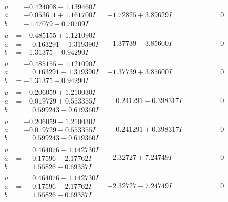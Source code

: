 \documentclass[1p]{elsarticle_modified}
\theoremstyle{definition}
\begin{document}
$$\begin{array}{c|c|c}
\begin{aligned}
u &= -0.424008 - 1.139460 I \\
a &= -0.053611 + 1.161700 I \\
b &= -1.47079 + 0.70709 I\end{aligned}
 & -1.72825 + 3.89629 I & \phantom{-0.000000 } 0 \\ \hline\begin{aligned}
u &= -0.485155 + 1.121090 I \\
a &= \phantom{-}0.163291 - 1.319390 I \\
b &= -1.31375 - 0.94290 I\end{aligned}
 & -1.37739 - 3.85600 I & \phantom{-0.000000 } 0 \\ \hline\begin{aligned}
u &= -0.485155 - 1.121090 I \\
a &= \phantom{-}0.163291 + 1.319390 I \\
b &= -1.31375 + 0.94290 I\end{aligned}
 & -1.37739 + 3.85600 I & \phantom{-0.000000 } 0 \\ \hline\begin{aligned}
u &= -0.206059 + 1.210030 I \\
a &= -0.019729 + 0.553355 I \\
b &= \phantom{-}0.599243 - 0.619360 I\end{aligned}
 & \phantom{-}0.241291 - 0.398317 I & \phantom{-0.000000 } 0 \\ \hline\begin{aligned}
u &= -0.206059 - 1.210030 I \\
a &= -0.019729 - 0.553355 I \\
b &= \phantom{-}0.599243 + 0.619360 I\end{aligned}
 & \phantom{-}0.241291 + 0.398317 I & \phantom{-0.000000 } 0 \\ \hline\begin{aligned}
u &= \phantom{-}0.464076 + 1.142730 I \\
a &= \phantom{-}0.17596 - 2.17762 I \\
b &= \phantom{-}1.55826 - 0.69337 I\end{aligned}
 & -2.32727 + 7.24749 I & \phantom{-0.000000 } 0 \\ \hline\begin{aligned}
u &= \phantom{-}0.464076 - 1.142730 I \\
a &= \phantom{-}0.17596 + 2.17762 I \\
b &= \phantom{-}1.55826 + 0.69337 I\end{aligned}
 & -2.32727 - 7.24749 I & \phantom{-0.000000 } 0 \\ \hline\begin{aligned}

\end{aligned}
\end{array}$$
\end{document}
